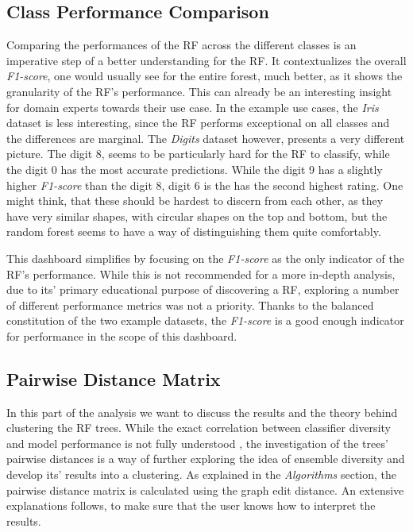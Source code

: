 \documentclass[a4paper, 12pt]{article}
\begin{document}
\subsection{Class Performance Comparison}
Comparing the performances of the RF across the different classes is an imperative step of a better
understanding for the RF. It contextualizes the overall \textit{F1-score}, one would usually see
for the entire forest, much better, as it shows the granularity of the RF's performance.
This can already be an interesting insight for domain experts towards their use case. In the example
use cases, the \textit{Iris} dataset is less interesting, since the RF performs exceptional on all
classes and the differences are marginal. The \textit{Digits} dataset however, presents a very different
picture. The digit 8, seems to be particularly hard for the RF to classify, while the digit 0 has the most
accurate predictions. While the digit 9 has a slightly higher \textit{F1-score} than the digit 8, digit 6
is the has the second highest rating. One might think, that these should be hardest to discern from each
other, as they have very similar shapes, with circular shapes on the top and bottom, but the random forest
seems to have a way of distinguishing them quite comfortably. \par

This dashboard simplifies by focusing on the \textit{F1-score} as the only indicator of the RF's
performance. While this is not recommended for a more in-depth analysis, due to its' primary educational
purpose of discovering a RF, exploring a number of different performance metrics was not a priority.
Thanks to the balanced constitution of the two example datasets, the \textit{F1-score} is a good enough
indicator for performance in the scope of this dashboard. \par

\subsection{Pairwise Distance Matrix}
In this part of the analysis we want to discuss the results and the theory behind clustering the RF trees.
While the exact correlation between classifier diversity and model performance is not fully understood
\cite{kuncheva2003measures}, the investigation of the trees' pairwise distances is a way of further exploring
the idea of ensemble diversity and develop its' results into a clustering.
As explained in the \textit{Algorithms} section, the pairwise distance matrix is calculated using the graph
edit distance. An extensive explanations follows, to make sure that the user knows how to interpret the
results. \par
\end{document}
